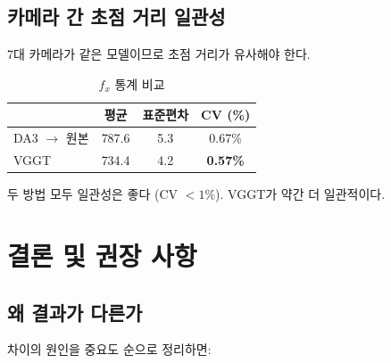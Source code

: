 \documentclass[11pt, a4paper]{report}
\begin{document}
\section{카메라 간 초점 거리 일관성}

7대 카메라가 같은 모델이므로 초점 거리가 유사해야 한다.

\begin{table}[H]
\centering
\caption{$f_x$ 통계 비교}
\renewcommand{\arraystretch}{1.3}
\begin{tabular}{l ccc}
\toprule
& \textbf{평균} & \textbf{표준편차} & \textbf{CV (\%)} \\
\midrule
DA3 $\rightarrow$ 원본 & 787.6 & 5.3 & 0.67\% \\
VGGT & 734.4 & 4.2 & \textbf{0.57\%} \\
\bottomrule
\end{tabular}
\end{table}

두 방법 모두 일관성은 좋다 (CV $< 1\%$). VGGT가 약간 더 일관적이다.


\chapter{결론 및 권장 사항}

\section{왜 결과가 다른가}

차이의 원인을 중요도 순으로 정리하면:
\end{document}
